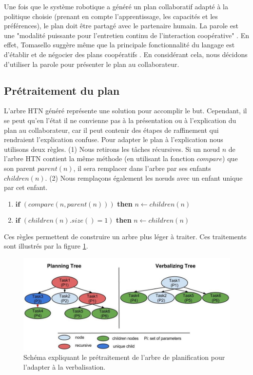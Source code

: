 \documentclass[a4paper,11pt,twoside]{StyleThese}
\begin{document}
Une fois que le système robotique a généré un plan collaboratif adapté à la politique choisie (prenant en compte l'apprentissage, les capacités et les préférences), le plan doit être partagé avec le partenaire humain.
La parole est une "modalité puissante pour l'entretien continu de l'interaction coopérative" \cite{Lallee2013}. En effet, Tomasello suggère même que la principale fonctionnalité du langage est d'établir et de négocier des plans coopératifs \cite{tomasello2005}.
En considérant cela, nous décidons d'utiliser la parole pour présenter le plan au collaborateur.

\subsection{Prétraitement du plan}
L'arbre HTN généré représente une solution pour accomplir le but. Cependant, il se peut qu'en l'état il ne convienne pas à la présentation ou à l'explication du plan au collaborateur, car il peut contenir des étapes de raffinement qui rendraient l'explication confuse. Pour adapter le plan à l'explication nous utilisons deux règles.
%
(1) Nous retirons les tâches récursives. Si un nœud $n$ de l'arbre HTN contient la même méthode (en utilisant la fonction $compare$) que son parent $parent(n)$, il sera remplacer dans l'arbre par ses enfants $children(n)$. (2) Nous remplaçons également les nœuds avec un enfant unique par cet enfant.
\begin{enumerate}
\item $\textbf{if}$ $(compare(n, parent(n)))$ \textbf{then} $n \leftarrow children(n)$
\item $\textbf{if}$ $(children(n).size() = 1)$ \textbf{then} $n \leftarrow children(n)$
\end{enumerate}
Ces règles permettent de construire un arbre plus léger à traiter.
Ces traitements sont illustrés par la figure \ref{fig:pretraitement}.

\begin{figure}[ht!]
 \centering
  \includegraphics[width=0.99 \textwidth]{img/rules2.jpg}
 \caption{Schéma expliquant le prétraitement de l'arbre de planification pour l'adapter à la verbalisation.}
 \label{fig:pretraitement}
 \end{figure}
\end{document}
